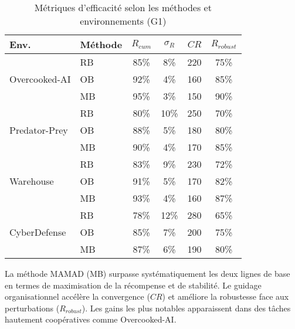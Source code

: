 \begin{table}[h!]
    \centering
    \caption{Métriques d'efficacité selon les méthodes et environnements (G1)}
    \begin{tabular}{l|l|cccc}
        \hline
        \textbf{Env.} & \textbf{Méthode} & $R_{cum}$ & $\sigma_R$ & $CR$ & $R_{robust}$ \\
        \hline
        \multirow{3}{*}{Overcooked-AI}
                      & RB              & 85\%      & 8\%        & 220  & 75\%         \\
                      & OB              & 92\%      & 4\%        & 160  & 85\%         \\
                      & MB              & 95\%      & 3\%        & 150  & 90\%         \\
        \hline
        \multirow{3}{*}{Predator-Prey}
                      & RB              & 80\%      & 10\%       & 250  & 70\%         \\
                      & OB              & 88\%      & 5\%        & 180  & 80\%         \\
                      & MB              & 90\%      & 4\%        & 170  & 85\%         \\
        \hline
        \multirow{3}{*}{Warehouse}
                      & RB              & 83\%      & 9\%        & 230  & 72\%         \\
                      & OB              & 91\%      & 5\%        & 170  & 82\%         \\
                      & MB              & 93\%      & 4\%        & 160  & 87\%         \\
        \hline
        \multirow{3}{*}{CyberDefense}
                      & RB              & 78\%      & 12\%       & 280  & 65\%         \\
                      & OB              & 85\%      & 7\%        & 200  & 75\%         \\
                      & MB              & 87\%      & 6\%        & 190  & 80\%         \\
        \hline
    \end{tabular}
    \label{tab:g1_efficiency_full}
\end{table}

La méthode MAMAD (MB) surpasse systématiquement les deux lignes de base en termes de maximisation de la récompense et de stabilité. Le guidage organisationnel accélère la convergence ($CR$) et améliore la robustesse face aux perturbations ($R_{robust}$). Les gains les plus notables apparaissent dans des tâches hautement coopératives comme Overcooked-AI.

